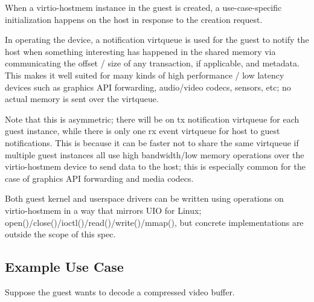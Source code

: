 When a virtio-hostmem instance in the guest is created,
a use-case-specific initialization happens on the host
in response to the creation request.

In operating the device, a notification virtqueue is used for the guest to notify the host
when something interesting has happened in the shared memory via communicating
the offset / size of any transaction, if applicable, and metadata.
This makes it well suited for many kinds of high performance / low latency
devices such as graphics API forwarding, audio/video codecs, sensors, etc;
no actual memory is sent over the virtqueue.

Note that this is asymmetric;
there will be on tx notification virtqueue for each guest instance,
while there is only one rx event virtqueue for host to guest notifications.
This is because it can be faster not to share the same virtqueue
if multiple guest instances all use high bandwidth/low memory operations
over the virtio-hostmem device to send data to the host;
this is especially common for the case of graphics API forwarding
and media codecs.

Both guest kernel and userspace drivers can be written using operations
on virtio-hostmem in a way that mirrors UIO for Linux;
open()/close()/ioctl()/read()/write()/mmap(),
but concrete implementations are outside the scope of this spec.

\subsection{Example Use Case}\label{sec:Device Types / Host Memory Device / Example Use Case}

Suppose the guest wants to decode a compressed video buffer.

